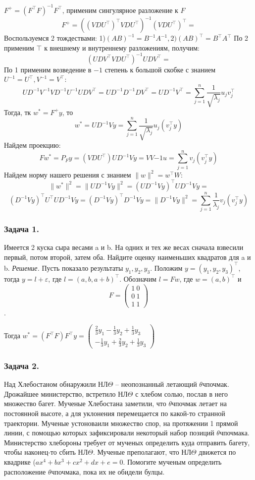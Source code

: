 $F^+ = (F^\top F)^{-1}F^\top$, применим сингулярное разложение к $F$
$$F^+ = ((VDU^\top)^\top VDU^\top)^{-1} (VDU^\top)^\top =$$
Воспользуемся 2 тождествами: 1)$(AB)^{-1} = B^{-1} A^{-1}, 2) (AB)^{\top} = B^{\top} A^{\top}$
По 2 применим $\top$ к внешнему и внутреннему разложениям, получим:
$$(UDV^\top VDU^\top)^{-1} UDV^\top =$$
По 1 применим возведение в $-1$ степень к большой скобке с знанием $U^{-1} = U^\top, V^{-1} = V^\top$:
$$UD^{-1}V^{-1}VD^{-1}U^{-1} UDV^\top = UD^{-1}D^{-1}DV^\top = UD^{-1}V^\top = \sum_{j = 1}^n \frac{1}{\sqrt{\lambda_j}}u_j v_j^\top$$
Тогда, тк $w^* = F^+ y$, то
$$w^* = UD^{-1}Vy = \sum_{j = 1}^n \frac{1}{\sqrt{\lambda_j}}u_j (v_j^\top y)$$
Найдем проекцию:
$$Fw^* = P_Fy = (VDU^\top) UD^{-1}Vy = VV{-1}u = \sum_{j = 1}^n v_j(v_j^\top y)$$
Найдем норму нашего решения с знанием $\|w\|^2 = w^\top W$:
$$\|w^*\|^2 = \|UD^{-1}Vy\|^2 = (UD^{-1}Vy)^\top UD^{-1}Vy =$$
$$(D^{-1}Vy)^{\top} U^\top UD^{-1}Vy = (D^{-1}Vy)^{\top} D^{-1}Vy = \|D^{-1}Vy\|^2 =  \sum_{j = 1}^n \frac{1}{\lambda_j}v_j(v_j^\top y)$$

\subsubsection*{Задача 1.}
Имеется 2 куска сыра весами a и b. На одних и тех же весах сначала взвесили первый, потом второй, затем оба. Найдите оценку наименьших квадратов для a и b.
\noindent\textit{Решение.} Пусть показало результаты $y_1, y_2, y_3$. Положим $y = (y_1, y_2, y_3)^\top$, тогда $y = l + \varepsilon$, где $l = (a, b, a + b)^\top$. Обозначим $l = Fw$, где $w = (a, b)^\top$ и 
$$F = \begin{pmatrix}
    1 \ 0 \\
    0 \ 1 \\
    1 \ 1
  \end{pmatrix}$$.

Тогда $w^* = (F^\top F) F^\top y = \begin{pmatrix}
    \frac{2}{3}y_1 - \frac{1}{3}y_2 + \frac{1}{3}y_3 \\
    -\frac{1}{3}y_1 + \frac{2}{3}y_2 + \frac{1}{3}y_3
  \end{pmatrix}$

\subsubsection*{Задача 2.} Над Хлебостаном обнаружили НЛ$\Theta$ -- неопознанный летающий $\theta$чпочмак. Дрожайшее министерство, встретило НЛ$\Theta$ с хлебом солью, послав в него множество багет.
Мученые Хлебостана заметили, что $\theta$чпочмак летает на постоянной высоте, а для уклонения перемещается по какой-то странной траектории. Мученые устоноваили множество спор, на протяжении 1 прямой линии, с помощью которых зафиксировали некоторый набор позиций $\theta$чпочмака. Министерство хлебороны требует от мученых определить куда отправить багету, чтобы наконец-то сбить НЛ$\Theta$. Мученые преполагают, что НЛ$\Theta$ движется по квадрике ($ax^4 + bx^3 + cx^2 + dx + e = 0$. Помогите мученым определить расположение $\theta$чпочмака, пока их не обидели булцы.

